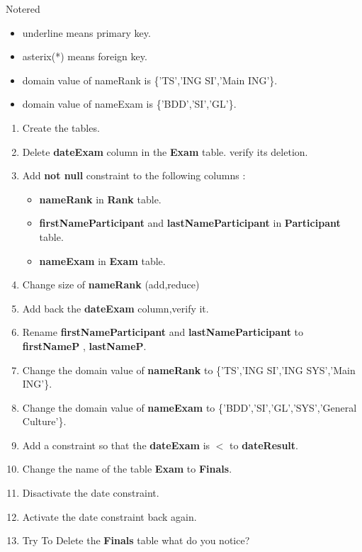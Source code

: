 \vspace{0.35cm}

\begin{prettyBox}{Note}{red}
\begin{itemize}
    \item underline means primary key.
    \item asterix(*) means foreign key.
    \item domain value of nameRank is \{'TS','ING SI','Main ING'\}.
    \item domain value of nameExam is \{'BDD','SI','GL'\}.
\end{itemize}
\end{prettyBox}

\vspace{0.35cm}
\begin{enumerate}
    \item Create the tables.
    \item Delete \textbf{dateExam} column in the \textbf{Exam} table. verify its deletion.
    \item Add \textbf{not null} constraint to the following columns :
        \begin{itemize}
            \item \textbf{nameRank} in \textbf{Rank} table.
            \item \textbf{firstNameParticipant} and \textbf{lastNameParticipant} in \textbf{Participant} table.
            \item \textbf{nameExam} in \textbf{Exam} table.
        \end{itemize}
    \item Change size of \textbf{nameRank} (add,reduce)
    \item Add back the \textbf{dateExam} column,verify it.
    \item Rename  \textbf{firstNameParticipant} and \textbf{lastNameParticipant} to \textbf{firstNameP} , \textbf{lastNameP}.
    \item Change the domain value of \textbf{nameRank} to \{'TS','ING SI','ING SYS','Main ING'\}.
    \item Change the domain value of  \textbf{nameExam} to \{'BDD','SI','GL','SYS','General Culture'\}.
    \item Add a constraint so that the \textbf{dateExam} is \(<\) to \textbf{dateResult}.
    \item Change the name of the table \textbf{Exam} to \textbf{Finals}.
    \item Disactivate the date constraint.
    \item Activate the date constraint back again.
    \item Try To Delete the \textbf{Finals} table what do you notice?
\end{enumerate}

